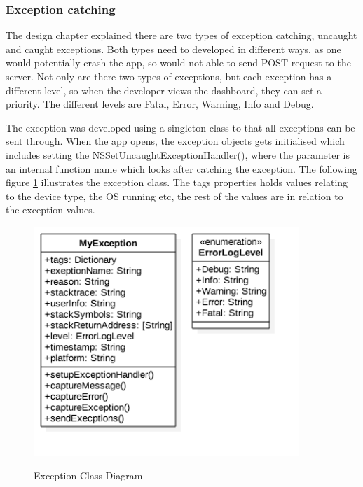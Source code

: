 
\subsubsection{Exception catching}

The design chapter explained there are two types of exception catching, uncaught and caught exceptions. Both types need to developed in different ways, as one would potentially crash the app, so would not able to send POST request to the server. Not only are there two types of exceptions, but each exception has a different level, so when the developer views the dashboard, they can set a priority. The different levels are Fatal, Error, Warning, Info and Debug.

The exception was developed using a singleton class to that all exceptions can be sent through. When the app opens, the exception objects gets initialised which includes setting the NSSetUncaughtExceptionHandler(), where the parameter is an internal function name which looks after catching the exception. The following figure \ref{fig:exception-cd} illustrates the exception class. The tags properties holds values relating to the device type, the OS running etc, the rest of the values are in relation to the exception values.

\begin{figure}[!h]
    \caption{Exception Class Diagram}
    \centering
    \includegraphics[width=100mm]{images/classdiagrams/Exception}
    \label{fig:exception-cd}
\end{figure}

